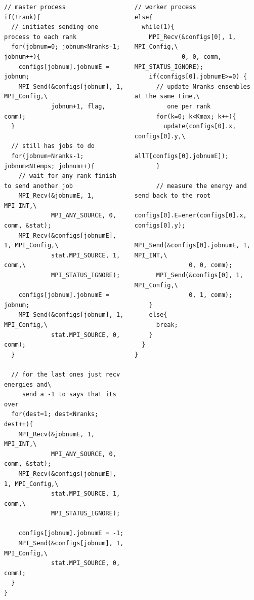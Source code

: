 \documentclass{beamer}
\begin{document}
\begin{frame}[fragile]
  \begin{tiny}
    \begin{columns}
      \begin{column}{0.5\textwidth}
\begin{verbatim}
// master process
if(!rank){
  // initiates sending one process to each rank
  for(jobnum=0; jobnum<Nranks-1; jobnum++){
    configs[jobnum].jobnumE = jobnum;
    MPI_Send(&configs[jobnum], 1, MPI_Config,\
             jobnum+1, flag, comm);
  }
  
  // still has jobs to do
  for(jobnum=Nranks-1; jobnum<Ntemps; jobnum++){
    // wait for any rank finish to send another job
    MPI_Recv(&jobnumE, 1, MPI_INT,\
             MPI_ANY_SOURCE, 0, comm, &stat);
    MPI_Recv(&configs[jobnumE], 1, MPI_Config,\
             stat.MPI_SOURCE, 1, comm,\
             MPI_STATUS_IGNORE);

    configs[jobnum].jobnumE = jobnum;
    MPI_Send(&configs[jobnum], 1, MPI_Config,\
             stat.MPI_SOURCE, 0, comm);
  }

  // for the last ones just recv energies and\
     send a -1 to says that its over
  for(dest=1; dest<Nranks; dest++){
    MPI_Recv(&jobnumE, 1, MPI_INT,\
             MPI_ANY_SOURCE, 0, comm, &stat);
    MPI_Recv(&configs[jobnumE], 1, MPI_Config,\
             stat.MPI_SOURCE, 1, comm,\
             MPI_STATUS_IGNORE);
	
    configs[jobnum].jobnumE = -1;
    MPI_Send(&configs[jobnum], 1, MPI_Config,\
             stat.MPI_SOURCE, 0, comm);
  }
}
\end{verbatim}
      \end{column}
      \begin{column}{0.5\textwidth}
\begin{verbatim}
// worker process
else{
  while(1){
    MPI_Recv(&configs[0], 1, MPI_Config,\
             0, 0, comm, MPI_STATUS_IGNORE);
    if(configs[0].jobnumE>=0) {
      // update Nranks ensembles at the same time,\
         one per rank
      for(k=0; k<Kmax; k++){
        update(configs[0].x, configs[0].y,\
               allT[configs[0].jobnumE]);
      }
	
      // measure the energy and send back to the root
      configs[0].E=ener(configs[0].x, configs[0].y);
      MPI_Send(&configs[0].jobnumE, 1, MPI_INT,\
               0, 0, comm);
      MPI_Send(&configs[0], 1, MPI_Config,\
               0, 1, comm);
    }
    else{
      break;
    }
  }
}
\end{verbatim}
      \end{column}
    \end{columns}
  \end{tiny}
\end{frame}
\end{document}
